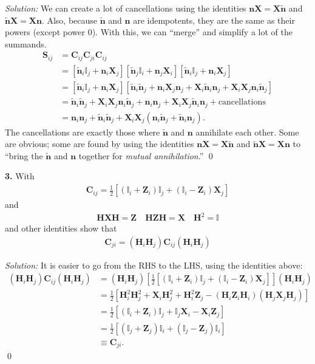 \documentclass{book}
\theoremstyle{definition}
\newcommand{\nn}{\nonumber}
\newcommand{\n}{\mathbf{n}}
\newcommand{\X}{\mathbf{X}}
\newcommand{\f}[2]{\frac{#1}{#2}}
\newcommand{\lb}{\left[}
\newcommand{\rb}{\right]}
\newcommand{\Id}{\mathbb{I}}
\newcommand{\Z}{\mathbf{Z}}
\newcommand{\had}{\mathbf{H}}
\begin{document}
\noindent \textit{Solution:} We can create a lot of cancellations using the identities $\n\X = \X \tilde{\n}$ and $\tilde{\n}\X = \X\n$. Also, because $\tilde{\n}$ and $\n$ are idempotents, they are the same as their powers (except power 0). With this, we can ``merge'' and simplify a lot of the summands. 
\begin{align}
\mathbf{S}_{ij} &= \mathbf{C}_{ij}\mathbf{C}_{ji}\mathbf{C}_{ij}\nn\\
&= [\tilde{\n}_i\Id_j + \n_i \X_j][\tilde{\n}_j\Id_i + \n_j \X_i][\tilde{\n}_i\Id_j + \n_i \X_j]\nn\\
&= [\tilde{\n}_i\Id_j + \n_i \X_j][\tilde{\n}_i \tilde{\n}_j + \n_i \X_j \n_j +  \X_i \tilde{\n}_i \n_j + \X_i\X_j{\n}_i\tilde{\n}_j]\nn\\
&= \tilde{\n}_i\tilde{\n}_j + \X_i\X_j {\n}_i\tilde{\n}_j + \n_i\n_j +  \X_i\X_j\tilde{\n}_i{\n}_j + \text{cancellations}\nn\\
&= \n_i\n_j + \tilde{\mathbf{\n}}_i \tilde{\mathbf{\n}}_j + \X_i\X_j(\n_i\tilde{\mathbf{n}}_j + \tilde{\mathbf{n}}_i \n_j).
\end{align}
The cancellations are exactly those where $\tilde{\n}$ and $\n$ annihilate each other. Some are obvious; some are found by using the identities $\n\X = \X \tilde{\n}$ and $\tilde{\n}\X = \X\n$ to ``bring the $\tilde{\n}$ and $\n$ together for \textit{mutual annihilation}.''
\qed





\newpage


\noindent \textbf{3.} With  
\begin{align}
\mathbf{C}_{ij} = \f{1}{2}\lb (\Id_i + \Z_i)\Id_j + (\Id_i - \Z_i)\X_j \rb
\end{align}
and
\begin{align}
\had \X \had = \Z \quad \had \Z \had = \X \quad \had^2 =\Id
\end{align}
and other identities show that
\begin{align}
\mathbf{C}_{ji} = (\had_i \had_j)\mathbf{C}_{ij}(\had_i\had_j)
\end{align}



\noindent \textit{Solution:} It is easier to go from the RHS to the LHS, using the identities above:
\begin{align}
(\had_i \had_j)\mathbf{C}_{ij}(\had_i\had_j) &= (\had_i \had_j)\lb \f{1}{2}\lb (\Id_i + \Z_i)\Id_j + (\Id_i - \Z_i)\X_j \rb  \rb(\had_i\had_j)\nn\\
&= \f{1}{2}\lb \had_i^2\had_j^2 + \X_i \had_j^2 +  \had_i^2 \Z_j - (\had_i\Z_i\had_i)(\had_j\X_j\had_j) \rb\nn\\
&= \f{1}{2}\lb (\Id_i + \Z_i)\Id_j + \Id_j \X_i - \X_i \Z_j \rb\nn\\
&= \f{1}{2}\lb (\Id_j + \Z_j)\Id_i + (\Id_j - \Z_j)\Id_i  \rb\nn\\
&\equiv \mathbf{C}_{ji}.
\end{align}\qed
\end{document}
